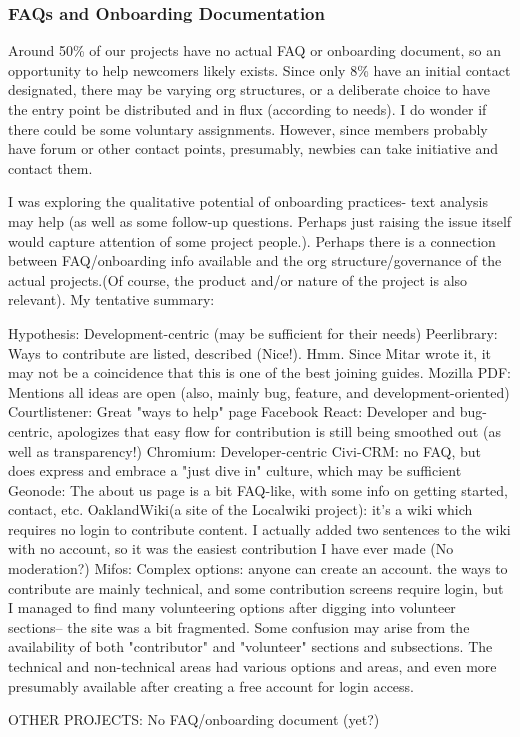 \subsubsection{FAQs and Onboarding Documentation}

Around 50\% of our projects have no actual FAQ or onboarding document, so an opportunity to help newcomers likely exists. Since only 8\% have an initial contact designated, there may be varying org structures, or a deliberate choice to have the entry point be distributed and in flux (according to needs). I do wonder if there could be some voluntary assignments. However, since members probably have forum or other contact points, presumably, newbies can take initiative and contact them.

I was exploring the qualitative potential of onboarding practices- text analysis may help (as well as some follow-up questions. Perhaps just raising the issue itself would capture attention of some project people.). Perhaps there is a connection between FAQ/onboarding info available and the org structure/governance of the actual projects.(Of course, the product and/or nature of the project is also relevant). My tentative summary:

Hypothesis: Development-centric (may be sufficient for their needs)
Peerlibrary: Ways to contribute are listed, described (Nice!). Hmm. Since Mitar wrote it, it may not be a coincidence that this is one of the best joining guides.
Mozilla PDF: Mentions all ideas are open (also, mainly bug, feature, and development-oriented)
Courtlistener: Great "ways to help" page
Facebook React: Developer and bug-centric, apologizes that easy flow for contribution is still being smoothed out (as well as transparency!)
Chromium: Developer-centric
Civi-CRM: no FAQ, but does express and embrace a  "just dive in" culture, which may be sufficient
Geonode: The about us page is a bit FAQ-like, with some info on getting started, contact, etc.
OaklandWiki(a site of the Localwiki project): it's a wiki which requires no login to contribute content. I actually added two sentences to the wiki with no account, so it was the easiest contribution I have ever made (No moderation?)
Mifos: Complex options: anyone can create an account. the ways to contribute are mainly technical, and some contribution screens require login, but I managed to find many volunteering options after digging into volunteer sections-- the site was a bit fragmented. Some confusion may arise from the availability of both "contributor" and "volunteer" sections and subsections. The technical and non-technical areas had various options and areas, and even more presumably available after creating a free account for login access.

OTHER PROJECTS: No FAQ/onboarding document (yet?)




